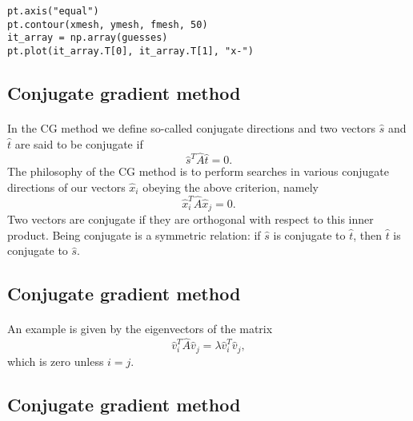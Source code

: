 \documentclass[%
oneside,                 %
final,                   %
10pt]{article}
\begin{document}
\begin{verbatim}
pt.axis("equal")
pt.contour(xmesh, ymesh, fmesh, 50)
it_array = np.array(guesses)
pt.plot(it_array.T[0], it_array.T[1], "x-")

\end{verbatim}


\subsection*{Conjugate gradient method}

\paragraph{}
In the CG method we define so-called conjugate directions and two vectors 
$\hat{s}$ and $\hat{t}$
are said to be
conjugate if
\begin{equation*}
\hat{s}^T\hat{A}\hat{t}= 0.
\end{equation*}
The philosophy of the CG method is to perform searches in various conjugate directions
of our vectors $\hat{x}_i$ obeying the above criterion, namely
\begin{equation*}
\hat{x}_i^T\hat{A}\hat{x}_j= 0.
\end{equation*}
Two vectors are conjugate if they are orthogonal with respect to 
this inner product. Being conjugate is a symmetric relation: if $\hat{s}$ is conjugate to $\hat{t}$, then $\hat{t}$ is conjugate to $\hat{s}$.



\subsection*{Conjugate gradient method}

\paragraph{}
An example is given by the eigenvectors of the matrix
\begin{equation*}
\hat{v}_i^T\hat{A}\hat{v}_j= \lambda\hat{v}_i^T\hat{v}_j,
\end{equation*}
which is zero unless $i=j$.



\subsection*{Conjugate gradient method}
\end{document}
